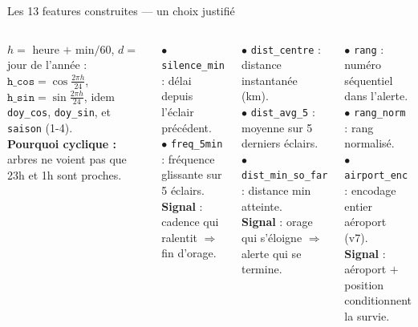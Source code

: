 \documentclass[aspectratio=169,t,11pt]{beamer}
\begin{document}
\begin{frame}{Les 13 features construites — un choix justifié}
\vspace{-2pt}
\begin{columns}[T]

\begin{tcolorbox}[mybox,colback=metMid!10,colframe=metMid,
  title={Temporelles cycliques (5)}]
\scriptsize
$h = $ heure $+$ min$/60$, $d = $ jour de l'année :
$\texttt{h\_cos}=\cos\tfrac{2\pi h}{24}$, $\texttt{h\_sin}=\sin\tfrac{2\pi h}{24}$,
idem \texttt{doy\_cos}, \texttt{doy\_sin}, et \texttt{saison} (1-4).\\[2pt]
\textbf{Pourquoi cyclique :} arbres ne voient pas que 23h et 1h sont proches.
\end{tcolorbox}
\vspace{3pt}
\begin{tcolorbox}[mybox,colback=metOrange!10,colframe=metOrange,
  title={Cadence / fréquence (2)}]
\scriptsize
$\bullet$ \texttt{silence\_min} : délai depuis l'éclair précédent.\\
$\bullet$ \texttt{freq\_5min} : fréquence glissante sur 5 éclairs.\\
\textbf{Signal} : cadence qui ralentit $\Rightarrow$ fin d'orage.
\end{tcolorbox}

\begin{tcolorbox}[mybox,colback=metGreen!10,colframe=metGreen,
  title={Distance à l'aéroport (3)}]
\scriptsize
$\bullet$ \texttt{dist\_centre} : distance instantanée (km).\\
$\bullet$ \texttt{dist\_avg\_5} : moyenne sur 5 derniers éclairs.\\
$\bullet$ \texttt{dist\_min\_so\_far} : distance min atteinte.\\
\textbf{Signal} : orage qui s'éloigne $\Rightarrow$ alerte qui se termine.
\end{tcolorbox}
\vspace{3pt}
\begin{tcolorbox}[mybox,colback=metRed!10,colframe=metRed,
  title={Contexte alerte / aéroport (3)}]
\scriptsize
$\bullet$ \texttt{rang} : numéro séquentiel dans l'alerte.\\
$\bullet$ \texttt{rang\_norm} : rang normalisé.\\
$\bullet$ \texttt{airport\_enc} : encodage entier aéroport (v7).\\
\textbf{Signal} : aéroport $+$ position conditionnent la survie.
\end{tcolorbox}
\end{columns}
\end{frame}
\end{document}
